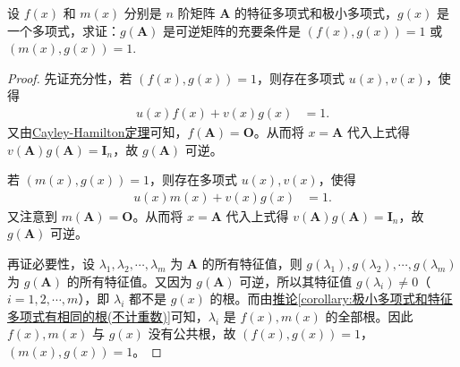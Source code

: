 \documentclass[../../main.tex]{subfiles}%
\begin{document}
\begin{proposition}\label{proposition:g(A)可逆与A的特征多项式与极小多项式的关系}
设 \(f(x)\) 和 \(m(x)\) 分别是 \(n\) 阶矩阵 \(\boldsymbol{A}\) 的特征多项式和极小多项式，\(g(x)\) 是一个多项式，求证：\(g(\boldsymbol{A})\) 是可逆矩阵的充要条件是 \((f(x),g(x)) = 1\) 或 \((m(x),g(x)) = 1\).
\end{proposition}
\begin{proof}

先证充分性，若 \((f(x),g(x)) = 1\)，则存在多项式 \(u(x),v(x)\)，使得
\begin{align*}
u(x)f(x)+v(x)g(x)&=1.
\end{align*}
又由\hyperref[theorem:Cayley-Hamilton定理]{Cayley-Hamilton定理}可知，\(f(\boldsymbol{A})=\boldsymbol{O}\)。从而将 \(x = \boldsymbol{A}\) 代入上式得 \(v(\boldsymbol{A})g(\boldsymbol{A})=\boldsymbol{I}_n\)，故 \(g(\boldsymbol{A})\) 可逆。

若 \((m(x),g(x)) = 1\)，则存在多项式 \(u(x),v(x)\)，使得
\begin{align*}
u(x)m(x)+v(x)g(x)&=1.
\end{align*}
又注意到 \(m(\boldsymbol{A})=\boldsymbol{O}\)。从而将 \(x = \boldsymbol{A}\) 代入上式得 \(v(\boldsymbol{A})g(\boldsymbol{A})=\boldsymbol{I}_n\)，故 \(g(\boldsymbol{A})\) 可逆。

再证必要性，设 \(\lambda_1,\lambda_2,\cdots,\lambda_m\) 为 \(\boldsymbol{A}\) 的所有特征值，则 \(g(\lambda_1),g(\lambda_2),\cdots,g(\lambda_m)\) 为 \(g(\boldsymbol{A})\) 的所有特征值。又因为 \(g(\boldsymbol{A})\) 可逆，所以其特征值 \(g(\lambda_i)\neq 0\)（\(i = 1,2,\cdots,m\)），即 \(\lambda_i\) 都不是 \(g(x)\) 的根。而由\hyperref[corollary:极小多项式和特征多项式有相同的根(不计重数)]{推论\ref{corollary:极小多项式和特征多项式有相同的根(不计重数)}}可知，\(\lambda_i\) 是 \(f(x),m(x)\) 的全部根。因此 \(f(x),m(x)\) 与 \(g(x)\) 没有公共根，故 \((f(x),g(x)) = 1\)，\((m(x),g(x)) = 1\)。 

\end{proof}
\end{document}
